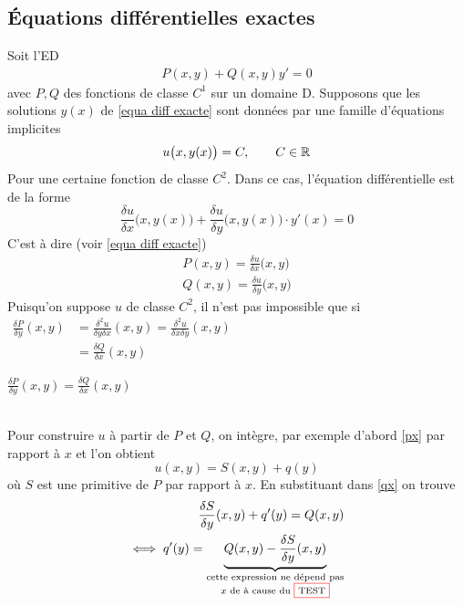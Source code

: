 \documentclass[12pt,a4paper]{article}
\begin{document}
\subsection{Équations différentielles exactes}
Soit l'ED 
\begin{align}
	P(x,y) + Q(x,y)y' = 0
	\label{equa diff exacte}
\end{align}
avec $P,Q$ des fonctions de classe $C^1$ sur un domaine D. Supposons que les solutions $y(x)$ de \eqref{equa diff exacte} sont données par une famille d'équations implicites
\begin{equation*}
	u\big(x,y(x)\big) = C,\qquad C \in \mathbb{R}
\end{equation*}
Pour une certaine fonction de classe $C^2$. Dans ce cas, l'équation différentielle est de la forme
\begin{equation*}
	\frac{\delta u}{\delta x}\big(x,y(x)\big) + \frac{\delta u}{\delta y}\big(x,y(x)\big) \cdot y'(x) = 0 
\end{equation*}
C'est à dire (voir \eqref{equa diff exacte})
\begin{align}
	P(x,y) = \frac{\delta u}{\delta x}\big(x,y\big) \label{px}\\
	Q(x,y) = \frac{\delta u}{\delta y}\big(x,y\big) \label{qx}
\end{align}
Puisqu'on suppose $u$ de classe $C^2$, il n'est pas impossible que si \\
$\begin{array}{ll}
	\frac{\delta P}{\delta y}(x,y) 	&= \frac{\delta^2 u}{\delta y \delta x}(x,y) = \frac{\delta^2 u}{\delta x \delta y}(x,y)\\
									&= \frac{\delta Q}{\delta x}(x,y)
\end{array}$
\begin{boite}[0.4]
	 $\frac{\delta P}{\delta y}(x,y) = \frac{\delta Q}{\delta x}(x,y)$
\end{boite}
\\
Pour construire $u$ à partir de $P$ et $Q$, on intègre, par exemple d'abord \eqref{px} par rapport à $x$ et l'on obtient 
\begin{equation*}
	u(x,y) = S(x,y) + q(y)
\end{equation*}
où $S$ est une primitive de $P$ par rapport à $x$. En substituant dans \eqref{qx} on trouve 
\begin{align*}
	\frac{\delta S}{\delta y}(x,y) + q'(y) = Q(x,y)\\
	\iff q'(y) = \underbrace{Q(x,y) - \frac{\delta S}{\delta y}(x,y)}_{\substack{\text{cette expression ne dépend pas}\\ x \text{ de à cause du \fcolorbox{red}{white}{TEST}}}}
\end{align*}
\end{document}
